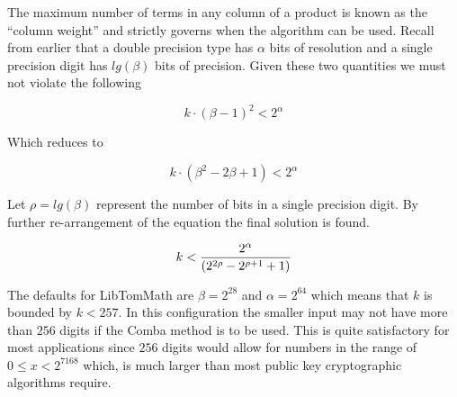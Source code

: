 \documentclass[b5paper]{book}
\begin{document}
The maximum number of terms in any column of a product is known as the ``column weight'' and strictly governs when the algorithm can be used.  Recall
from earlier that a double precision type has $\alpha$ bits of resolution and a single precision digit has $lg(\beta)$ bits of precision.  Given these
two quantities we must not violate the following

\begin{equation}
k \cdot \left (\beta - 1 \right )^2 < 2^{\alpha}
\end{equation}

Which reduces to 

\begin{equation}
k \cdot \left ( \beta^2 - 2\beta + 1 \right ) < 2^{\alpha}
\end{equation}

Let $\rho = lg(\beta)$ represent the number of bits in a single precision digit.  By further re-arrangement of the equation the final solution is
found.

\begin{equation}
k  < {{2^{\alpha}} \over {\left (2^{2\rho} - 2^{\rho + 1} + 1 \right )}}
\end{equation}

The defaults for LibTomMath are $\beta = 2^{28}$ and $\alpha = 2^{64}$ which means that $k$ is bounded by $k < 257$.  In this configuration 
the smaller input may not have more than $256$ digits if the Comba method is to be used.  This is quite satisfactory for most applications since 
$256$ digits would allow for numbers in the range of $0 \le x < 2^{7168}$ which, is much larger than most public key cryptographic algorithms require.  
\end{document}
